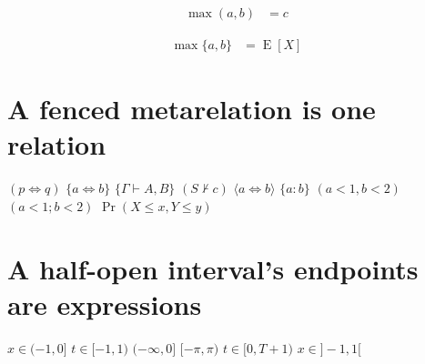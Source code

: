 \documentclass{article}
\begin{document}
\begin{equation}\begin{split}\max(a,b)&=c\end{split}\end{equation}

\begin{equation}\begin{split}\max\{a,b\}&=\operatorname{E}[X]\end{split}\end{equation}

\section{A fenced metarelation is one relation}
$(p\iff q)$ $\{a\iff b\}$ $\{\Gamma\vdash A,B\}$ $(S\not\vdash c)$ $\langle a\iff b\rangle$ $\{a:b\}$
$(a<1,b<2)$ $(a<1;b<2)$ $\Pr(X\le x,Y\le y)$

\section{A half-open interval's endpoints are expressions}
$x\in(-1,0]$ $t\in[-1,1)$ $(-\infty,0]$ $[-\pi,\pi)$ $t\in[0,T+1)$ $x\in]-1,1[$
\end{document}
